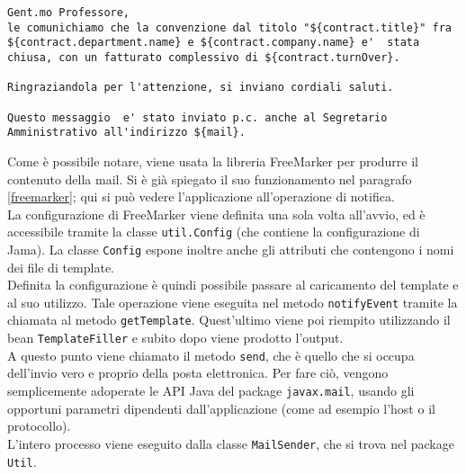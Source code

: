 \begin{lstlisting}
Gent.mo Professore,
le comunichiamo che la convenzione dal titolo "${contract.title}" fra ${contract.department.name} e ${contract.company.name} e'  stata chiusa, con un fatturato complessivo di ${contract.turnOver}.

Ringraziandola per l'attenzione, si inviano cordiali saluti.

Questo messaggio  e' stato inviato p.c. anche al Segretario Amministrativo all'indirizzo ${mail}.
\end{lstlisting}

Come è possibile notare, viene usata la libreria FreeMarker per produrre il contenuto della mail. Si è già spiegato il suo funzionamento nel paragrafo \ref{freemarker}; qui si può vedere l'applicazione all'operazione di notifica.\\
La configurazione di FreeMarker viene definita una sola volta all'avvio, ed è accessibile tramite la classe \lstinline{util.Config} (che contiene la configurazione di Jama). La classe \lstinline{Config} espone inoltre anche gli attributi che contengono i nomi dei file di template.\\
Definita la configurazione è quindi possibile passare al caricamento del template e al suo utilizzo. Tale operazione viene eseguita nel metodo \lstinline{notifyEvent} tramite la chiamata al metodo \lstinline{getTemplate}. Quest'ultimo viene poi riempito utilizzando il bean \lstinline{TemplateFiller} e subito dopo viene prodotto l'output. \\
A questo punto viene chiamato il metodo \lstinline{send}, che è quello che si occupa dell'invio vero e proprio della posta elettronica. Per fare ciò, vengono semplicemente adoperate le API Java del package \lstinline{javax.mail}, usando gli opportuni parametri dipendenti dall'applicazione (come ad esempio l'host o il protocollo).\\
L'intero processo viene eseguito dalla classe \lstinline{MailSender}, che si trova nel package \lstinline{Util}.
